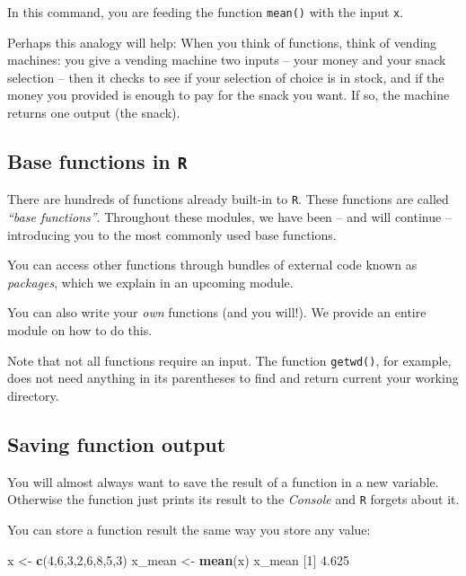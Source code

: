 \documentclass[]{book}
\newenvironment{Shaded}{\begin{snugshade}}{\end{snugshade}}
\newcommand{\DecValTok}[1]{\textcolor[rgb]{0.00,0.00,0.81}{#1}}
\newcommand{\FloatTok}[1]{\textcolor[rgb]{0.00,0.00,0.81}{#1}}
\newcommand{\KeywordTok}[1]{\textcolor[rgb]{0.13,0.29,0.53}{\textbf{#1}}}
\newcommand{\NormalTok}[1]{#1}
\newcommand{\StringTok}[1]{\textcolor[rgb]{0.31,0.60,0.02}{#1}}
\begin{document}
In this command, you are feeding the function \texttt{mean()} with the input \texttt{x}.

Perhaps this analogy will help: When you think of functions, think of vending machines: you give a vending machine two inputs -- your money and your snack selection -- then it checks to see if your selection of choice is in stock, and if the money you provided is enough to pay for the snack you want. If so, the machine returns one output (the snack).

\hypertarget{base-functions-in-r}{%
\subsection*{\texorpdfstring{Base functions in \texttt{R}}{Base functions in R}}\label{base-functions-in-r}}

There are hundreds of functions already built-in to \texttt{R}. These functions are called \emph{``base functions''}. Throughout these modules, we have been -- and will continue -- introducing you to the most commonly used base functions.

You can access other functions through bundles of external code known as \emph{packages}, which we explain in an upcoming module.

You can also write your \emph{own} functions (and you will!). We provide an entire module on how to do this.

Note that not all functions require an input. The function \texttt{getwd()}, for example, does not need anything in its parentheses to find and return current your working directory.

\hypertarget{saving-function-output}{%
\subsection*{Saving function output}\label{saving-function-output}}

You will almost always want to save the result of a function in a new variable. Otherwise the function just prints its result to the \emph{Console} and \texttt{R} forgets about it.

You can store a function result the same way you store any value:

\begin{Shaded}
\begin{Highlighting}[]
\NormalTok{x <-}\StringTok{ }\KeywordTok{c}\NormalTok{(}\DecValTok{4}\NormalTok{,}\DecValTok{6}\NormalTok{,}\DecValTok{3}\NormalTok{,}\DecValTok{2}\NormalTok{,}\DecValTok{6}\NormalTok{,}\DecValTok{8}\NormalTok{,}\DecValTok{5}\NormalTok{,}\DecValTok{3}\NormalTok{) }
\NormalTok{x_mean <-}\StringTok{ }\KeywordTok{mean}\NormalTok{(x) }
\NormalTok{x_mean}
\NormalTok{[}\DecValTok{1}\NormalTok{] }\FloatTok{4.625}
\end{Highlighting}
\end{Shaded}
\end{document}

